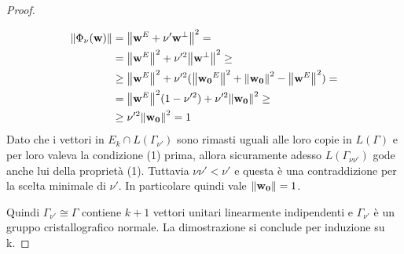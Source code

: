 \documentclass[a4paper,11pt,openright,twoside	]{book}
\begin{document}
\begin{proof}
\begin{itemize}
\[ \begin{split}
\norm{\Phi_{\nu}(\vb{w})} & = \norm{\vb{w}^E  + \nu' \vb{w}^{\perp}}^2 = \\
 & =  \norm{\vb{w}^E}^2 + \nu'^2 \norm{\vb{w}^{\perp}}^2 \geq \\
 & \geq \norm{\vb{w}^E}^2 + \nu'^2 (\norm{\vb{w_0}^E}^2 + \norm{\vb{w_0}}^2 - \norm{\vb{w}^E}^2  ) = \\
 & = \norm{\vb{w}^E}^2 (1 - \nu'^2)   + \nu'^2 \norm{\vb{w_0}}^2 \geq \\
 & \geq \nu'^2  \norm{\vb{w_0}}^2 = 1 
\end{split}
\]
Dato che i vettori in $E_k \cap L(\Gamma_{\nu'})$ sono rimasti uguali alle loro copie in $L(\Gamma)$ e per loro valeva la condizione (1) prima, allora sicuramente adesso $L(\Gamma_{\nu \nu'})$ gode anche lui della proprietà (1). 
Tuttavia $\nu \nu'< \nu'$ e questa è una contraddizione per la scelta minimale di $\nu'$.
In particolare quindi vale $\norm{\vb{w_0}} = 1$. 
\end{itemize}
Quindi  $\Gamma_{\nu'} \cong \Gamma$ contiene $k+1$ vettori unitari linearmente indipendenti e $\Gamma_{\nu'}$ è un gruppo cristallografico normale.  
La dimostrazione si conclude per induzione su k. 
\end{proof}
\end{document}
